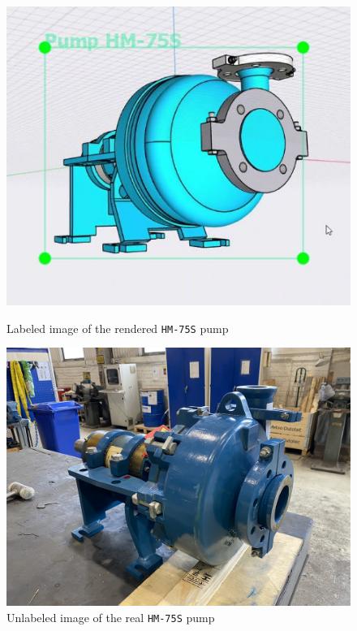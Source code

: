 \begin{figure}[!htb]
   \begin{minipage}{0.45\textwidth}
        \centering
     \includegraphics[width=0.9\linewidth]{./annotation_process.jpg}
     \caption{Labeled image of the rendered \texttt{HM-75S} pump}\label{Fig:rendered_pump} 
   \end{minipage}\hfill
   \begin{minipage}{0.45\textwidth}
\centering
     \includegraphics[width=\linewidth]{./pump_real.jpg}
     \caption{Unlabeled image of the real \texttt{HM-75S} pump}\label{Fig:real_pump}
   \end{minipage}
\end{figure}


